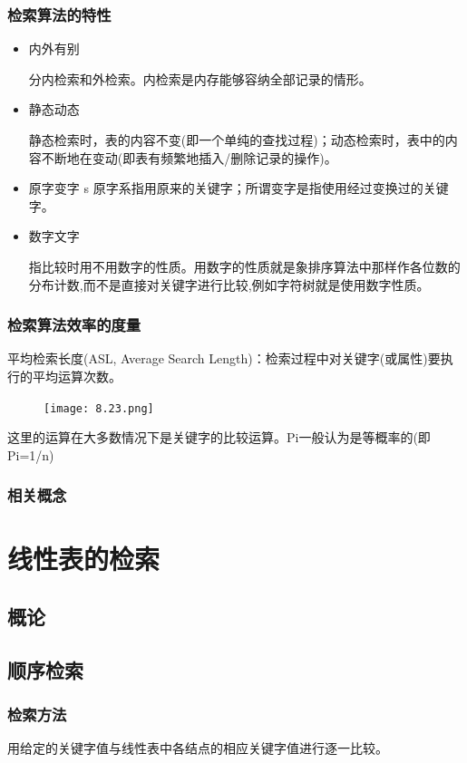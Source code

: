 \documentclass[AutoFakeBold]{LZUThesis2007}
\begin{document}
			\subsubsection{检索算法的特性}
\begin{itemize}
	\item 内外有别

分内检索和外检索。内检索是内存能够容纳全部记录的情形。 
	\item 静态动态

      静态检索时，表的内容不变(即一个单纯的查找过程)；动态检索时，表中的内容不断地在变动(即表有频繁地插入/删除记录的操作)。
	\item 原字变字
s
      原字系指用原来的关键字；所谓变字是指使用经过变换过的关键字。

	\item 数字文字

       指比较时用不用数字的性质。用数字的性质就是象排序算法中那样作各位数的分布计数,而不是直接对关键字进行比较,例如字符树就是使用数字性质。

\end{itemize}

			\subsubsection{检索算法效率的度量}
平均检索长度(ASL, Average Search Length)：检索过程中对关键字(或属性)要执行的平均运算次数。
\begin{figure}[H]
    \centering
    \texttt{[image: 8.23.png]}
    
    \label{fig_install_texlive}
\end{figure}
这里的运算在大多数情况下是关键字的比较运算。Pi一般认为是等概率的(即Pi=1/n)
			\subsubsection{相关概念}
	\section{线性表的检索}
		\subsection{概论}
		\subsection{顺序检索}

			\subsubsection{检索方法}
用给定的关键字值与线性表中各结点的相应关键字值进行逐一比较。
\end{document}
